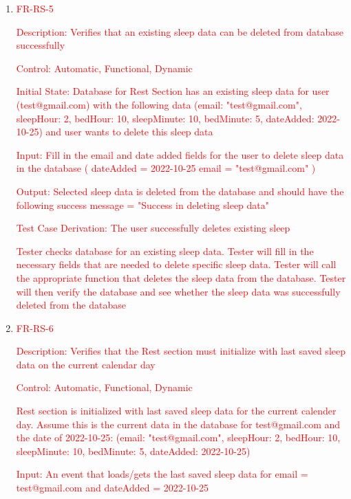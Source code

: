 \documentclass[12pt, titlepage]{article}
\begin{document}
\begin{enumerate}
  \item{\textcolor{red}{FR-RS-5\\}}

 \textcolor{red}{Description: Verifies that an existing sleep data can be deleted from database successfully}
	
	\textcolor{red}{Control: Automatic, Functional, Dynamic}
	
	\textcolor{red}{Initial State: Database for Rest Section has an existing sleep data for user (test@gmail.com) with the following data (email: "test@gmail.com", sleepHour: 2, bedHour: 10, sleepMinute: 10, bedMinute: 5, dateAdded: 2022-10-25) and user wants to delete this sleep data}
	
	\textcolor{red}{Input: Fill in the email and date added fields for the user to delete sleep data in the database ( dateAdded = 2022-10-25 email = "test@gmail.com" )}
	
	\textcolor{red}{Output: Selected sleep data is deleted from the database and should have the following success message = "Success in deleting sleep data"}
	
	\textcolor{red}{Test Case Derivation: The user successfully deletes existing sleep}
	
	\textcolor{red}{Tester checks database for an existing sleep data. Tester will fill in the necessary fields that are needed to delete specific sleep data. Tester will call the appropriate function that deletes the sleep data from the database. Tester will then verify the database and see whether the sleep data was successfully deleted from the database}

   \item{\textcolor{red}{FR-RS-6\\}}

 \textcolor{red}{Description: Verifies that the Rest section must initialize with last saved sleep data on the current calendar day}
	
	\textcolor{red}{Control: Automatic, Functional, Dynamic}
	
	\textcolor{red}{Rest section is initialized with last saved sleep data for the current calender day. Assume this is the current data in the database for test@gmail.com and the date of 2022-10-25: (email: "test@gmail.com", sleepHour: 2, bedHour: 10, sleepMinute: 10, bedMinute: 5, dateAdded: 2022-10-25)}
	
	\textcolor{red}{Input: An event that loads/gets the last saved sleep data for email = test@gmail.com and dateAdded = 2022-10-25}
	

\end{enumerate}
\end{document}
